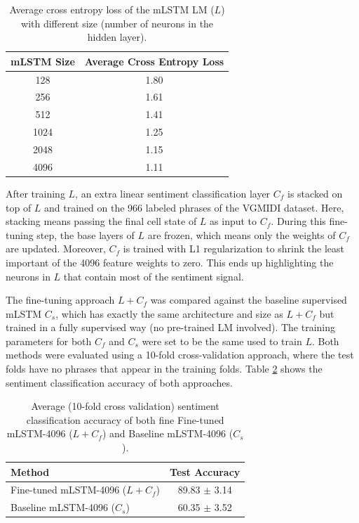 \begin{table}[!h]
 \begin{center}
 \begin{tabular}{cc}
  \hline
  \textbf{mLSTM Size} & \textbf{Average Cross Entropy Loss}\\ \hline
  128 & 1.80   \\
  256  & 1.61  \\
  512  & 1.41  \\
  1024 & 1.25  \\
  2048 & 1.15  \\
  4096 & 1.11  \\ \hline
 \end{tabular}
\end{center}
\caption{Average cross entropy loss of the mLSTM LM ($L$) with different size (number of neurons in the hidden layer).}
 \label{tab:gen_anal}
\end{table}

After training $L$, an extra linear sentiment classification layer $C_f$ is stacked on top of $L$ and trained on the 966 labeled phrases of the VGMIDI dataset. Here, stacking means passing the final cell state of $L$ as input to $C_f$. During this fine-tuning step, the base layers of $L$ are frozen, which means only the weights of $C_f$ are updated. Moreover, $C_f$ is trained with L1 regularization to shrink the least important of the 4096 feature weights to zero. This ends up highlighting the neurons in $L$ that contain most of the sentiment signal.

The fine-tuning approach $L + C_f$ was compared against the baseline supervised mLSTM $C_s$, which has exactly the same architecture and size as $L + C_f$ but trained in a fully supervised way (no pre-trained LM involved).
The training parameters for both $C_f$ and $C_s$ were set to be the same used to train $L$. Both methods were evaluated using a 10-fold cross-validation approach, where the test folds have no phrases that appear in the training folds. Table \ref{tab:sent_anal} shows the sentiment classification accuracy of both approaches.

\begin{table}[!h]
 \begin{center}
 \begin{tabular}{lc}
  \hline
  \textbf{Method} & \textbf{Test Accuracy} \\ \hline
  Fine-tuned mLSTM-4096 ($L + C_f$) & 89.83 $\pm$ 3.14\\
  Baseline mLSTM-4096 ($C_s$) & 60.35 $\pm$ 3.52 \\
  \hline
 \end{tabular}
\end{center}
\caption{Average (10-fold cross validation) sentiment classification accuracy of both fine Fine-tuned mLSTM-4096 ($L + C_f$) and Baseline mLSTM-4096 ($C_s$).}
 \label{tab:sent_anal}
\end{table}

